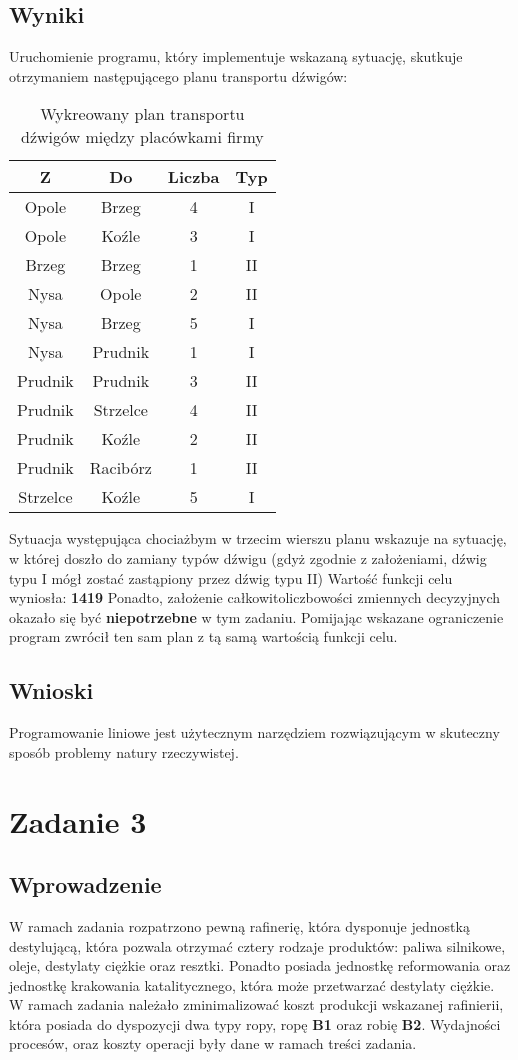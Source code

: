 \documentclass[a4paper,14pt]{report}
\begin{document}
\section{Wyniki}
    Uruchomienie programu, który implementuje wskazaną sytuację, skutkuje otrzymaniem następującego planu transportu dźwigów:
    \begin{table}[H]
        \centering
        \begin{tabular}{|c | c | c | c |} 
        \hline
        Z & Do & Liczba & Typ\\
        \hline
        Opole & Brzeg & 4 & I \\
        Opole & Koźle & 3 & I \\
        Brzeg & Brzeg & 1 & II \\
        Nysa & Opole & 2 & II \\
        Nysa & Brzeg & 5 & I \\
        Nysa & Prudnik & 1 & I \\
        Prudnik & Prudnik & 3 & II \\
        Prudnik & Strzelce & 4 & II \\
        Prudnik & Koźle & 2 & II \\
        Prudnik & Racibórz & 1 & II \\
        Strzelce & Koźle & 5 & I \\
        \hline
        \end{tabular}
        \caption{Wykreowany plan transportu dźwigów między placówkami firmy}
    \end{table}
    Sytuacja występująca chociażbym w trzecim wierszu planu wskazuje na sytuację, w której doszło do zamiany typów dźwigu (gdyż zgodnie z założeniami, dźwig typu I mógł 
    zostać zastąpiony przez dźwig typu II)
    Wartość funkcji celu wyniosła: \textbf{1419}
    Ponadto, założenie całkowitoliczbowości zmiennych decyzyjnych okazało się być \textbf{niepotrzebne} w tym zadaniu.
    Pomijając wskazane ograniczenie program zwrócił ten sam plan z tą samą wartością funkcji celu.
\section{Wnioski}
    Programowanie liniowe jest użytecznym narzędziem rozwiązującym w skuteczny sposób problemy natury rzeczywistej.
\chapter{Zadanie 3}
\section{Wprowadzenie}
    W ramach zadania rozpatrzono pewną rafinerię, która dysponuje jednostką destylującą, która pozwala 
    otrzymać cztery rodzaje produktów: paliwa silnikowe, oleje, destylaty ciężkie oraz resztki. Ponadto 
    posiada jednostkę reformowania oraz jednostkę krakowania katalitycznego, która może przetwarzać destylaty ciężkie.
    W ramach zadania należało zminimalizować koszt produkcji wskazanej rafinierii, która posiada do dyspozycji 
    dwa typy ropy, ropę \textbf{B1} oraz robię \textbf{B2}. Wydajności procesów, oraz koszty operacji były dane 
    w ramach treści zadania.
\end{document}
